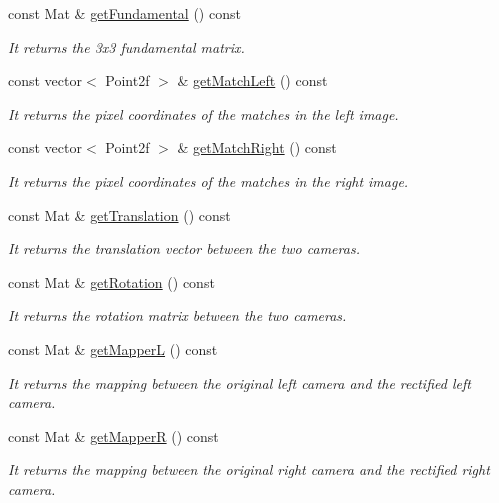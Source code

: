 \begin{DoxyCompactItemize}
const Mat \& \hyperlink{classStereoCamera_a87e95edbc88f47afac70549b0cd9743a}{get\+Fundamental} () const 
\begin{DoxyCompactList}\small\item\em It returns the 3x3 fundamental matrix. \end{DoxyCompactList}\item 
const vector$<$ Point2f $>$ \& \hyperlink{classStereoCamera_ae7bcae05698a2d39c1727dd376fd65da}{get\+Match\+Left} () const 
\begin{DoxyCompactList}\small\item\em It returns the pixel coordinates of the matches in the left image. \end{DoxyCompactList}\item 
const vector$<$ Point2f $>$ \& \hyperlink{classStereoCamera_a04ff7655263d84b819871bd9e7f900db}{get\+Match\+Right} () const 
\begin{DoxyCompactList}\small\item\em It returns the pixel coordinates of the matches in the right image. \end{DoxyCompactList}\item 
const Mat \& \hyperlink{classStereoCamera_ab73860e8b088c4bde2605c1b577854ec}{get\+Translation} () const 
\begin{DoxyCompactList}\small\item\em It returns the translation vector between the two cameras. \end{DoxyCompactList}\item 
const Mat \& \hyperlink{classStereoCamera_a86d38f0649b354dc9fb055b7e3c27487}{get\+Rotation} () const 
\begin{DoxyCompactList}\small\item\em It returns the rotation matrix between the two cameras. \end{DoxyCompactList}\item 
const Mat \& \hyperlink{classStereoCamera_ad07d6614b7c7bde0266fd61596a393a2}{get\+MapperL} () const 
\begin{DoxyCompactList}\small\item\em It returns the mapping between the original left camera and the rectified left camera. \end{DoxyCompactList}\item 
const Mat \& \hyperlink{classStereoCamera_a65bef258e07c35a95a9d594d23897a8e}{get\+MapperR} () const 
\begin{DoxyCompactList}\small\item\em It returns the mapping between the original right camera and the rectified right camera. \end{DoxyCompactList}\item 

\end{DoxyCompactItemize}
